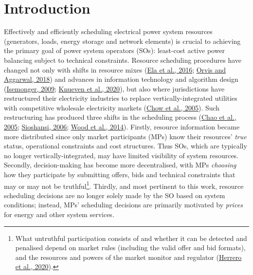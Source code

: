 \documentclass[12pt,a4paper,]{report}
\begin{document}
\hypertarget{sec:info-intro}{%
\section{Introduction}\label{sec:info-intro}}

Effectively and efficiently scheduling electrical power system resources
(generators, loads, energy storage and network elements) is crucial to
achieving the primary goal of power system operators (SOs): least-cost
active power balancing subject to technical constraints. Resource
scheduling procedures have changed not only with shifts in resource
mixes (\protect\hyperlink{ref-elaWholesaleElectricityMarket2016}{Ela et
al., 2016};
\protect\hyperlink{ref-orvisRefiningCompetitiveElectricity2018}{Orvis
and Aggarwal, 2018}) and advances in information technology and
algorithm design
(\protect\hyperlink{ref-isemongerEvolvingDesignRTO2009}{Isemonger,
2009};
\protect\hyperlink{ref-knuevenMixedintegerProgrammingFormulations2020}{Knueven
et al., 2020}), but also where jurisdictions have restructured their
electricity industries to replace vertically-integrated utilities with
competitive wholesale electricity markets
(\protect\hyperlink{ref-chowElectricityMarketDesign2005}{Chow et al.,
2005}). Such restructuring has produced three shifts in the scheduling
process (\protect\hyperlink{ref-chaoInterfaceEngineeringMarket2005}{Chao
et al., 2005};
\protect\hyperlink{ref-sioshansiElectricityMarketReform2006}{Sioshansi,
2006}; \protect\hyperlink{ref-woodPowerGenerationOperation2014}{Wood et
al., 2014}). Firstly, resource information became more distributed since
only market participants (MPs) know their resources' \emph{true} status,
operational constraints and cost structures. Thus SOs, which are
typically no longer vertically-integrated, may have limited visibility
of system resources. Secondly, decision-making has become more
decentralised, with MPs \emph{choosing} how they participate by
submitting offers, bids and technical constraints that may or may not be
truthful\footnote{What untruthful participation consists of and whether
  it can be detected and penalised depend on market rules (including the
  valid offer and bid formats), and the resources and powers of the
  market monitor and regulator
  (\protect\hyperlink{ref-herreroEvolvingBiddingFormats2020}{Herrero et
  al., 2020}).}. Thirdly, and most pertinent to this work, resource
scheduling decisions are no longer solely made by the SO based on system
conditions; instead, MPs' scheduling decisions are primarily motivated
by \emph{prices} for energy and other system services.
\end{document}
